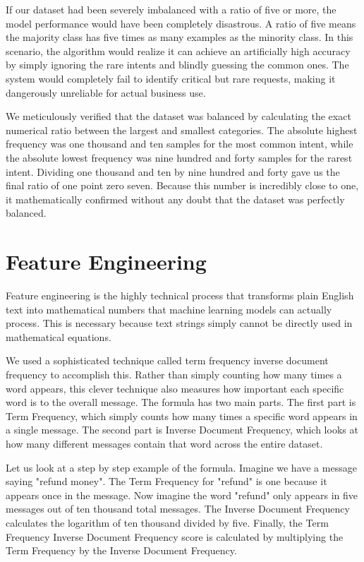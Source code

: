 \documentclass[12pt]{article}
\begin{document}
If our dataset had been severely imbalanced with a ratio of five or more, the model performance would have been completely disastrous. A ratio of five means the majority class has five times as many examples as the minority class. In this scenario, the algorithm would realize it can achieve an artificially high accuracy by simply ignoring the rare intents and blindly guessing the common ones. The system would completely fail to identify critical but rare requests, making it dangerously unreliable for actual business use.

We meticulously verified that the dataset was balanced by calculating the exact numerical ratio between the largest and smallest categories. The absolute highest frequency was one thousand and ten samples for the most common intent, while the absolute lowest frequency was nine hundred and forty samples for the rarest intent. Dividing one thousand and ten by nine hundred and forty gave us the final ratio of one point zero seven. Because this number is incredibly close to one, it mathematically confirmed without any doubt that the dataset was perfectly balanced.

\section{Feature Engineering}
Feature engineering is the highly technical process that transforms plain English text into mathematical numbers that machine learning models can actually process. This is necessary because text strings simply cannot be directly used in mathematical equations. 

We used a sophisticated technique called term frequency inverse document frequency to accomplish this. Rather than simply counting how many times a word appears, this clever technique also measures how important each specific word is to the overall message. The formula has two main parts. The first part is Term Frequency, which simply counts how many times a specific word appears in a single message. The second part is Inverse Document Frequency, which looks at how many different messages contain that word across the entire dataset. 

Let us look at a step by step example of the formula. Imagine we have a message saying "refund money". The Term Frequency for "refund" is one because it appears once in the message. Now imagine the word "refund" only appears in five messages out of ten thousand total messages. The Inverse Document Frequency calculates the logarithm of ten thousand divided by five. Finally, the Term Frequency Inverse Document Frequency score is calculated by multiplying the Term Frequency by the Inverse Document Frequency. 
\end{document}
